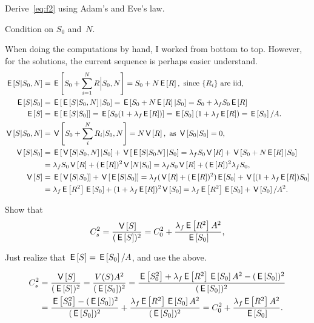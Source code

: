\documentclass[queueing-book.tex]{subfiles}
\begin{document}
\begin{exercise}\label{ex:f-4}
Derive~\cref{eq:f2} using  Adam's and Eve's law.
\begin{hint}
Condition on $S_0$ and~$N$.
\end{hint}
\begin{solution}
When doing the computations by hand, I worked from bottom to top. However, for the solutions, the current sequence is perhaps easier understand.
\begin{align*}
  \E{S|S_0, N} &=\E{S_0 + \sum_{i=1}^N R \Big|S_0, N} = S_0 + N \E R, \text{ since $\{R_i\}$ are iid},\\
  \E{S|S_0} &= \E{\E{S|S_{0}, N}|S_0} = \E{S_0 + N \E R |S_{0}} = S_0 + \lambda_f S_0 \E R\\
  \E{S} &= \E{\E{S|S_{0}}} = \E{S_0(1+\lambda_f  \E R)} = \E{S_0}(1 + \lambda_f \E R) = \E{S_0}/A.\\
  \V{S|S_0, N} &=  \V{S_0 + \sum_i^N R_i| S_{0}, N} = N \V R, \text{ as } \V{S_0|S_0} = 0,\\
\V{S|S_0} &= \E{\V{S|S_0, N} |S_0} + \V{\E{S|S_{0}N}|S_{0}} = \lambda_f S_0 \V R + \V{S_{0} + N \E R|S_0}\\
  &= \lambda_f S_0\V R + (\E R)^{2} \V{N|S_0} = \lambda_f S_0\V R + (\E R)^{2} \lambda_{f} S_{0}, \\
  \V S &= \E{\V{S|S_0}} + \V{\E{S|S_0}} = \lambda_f (\V R + (\E R)^2) \E{S_0} + \V{(1+\lambda_f \E R)S_{0}} \\
  &= \lambda_f \E{R^2} \E{S_0} + (1+\lambda_f \E R)^2 \V{S_{0}} = \lambda_f \E{R^2} \E{S_0} + \V{S_{0}}/A^{2}.
\end{align*}

\end{solution}
\end{exercise}


\begin{exercise}\label{ex:l-160}
Show that
 \begin{equation*}
 C_s^2 = \frac{\V{S}}{(\E S)^2} = C_0^2 + \frac{\lambda_f \E{R^2} A^2}{\E{S_0}},
 \end{equation*}
\begin{hint} Just realize that $\E{S} = \E{S_0}/A$, and use the above.
\end{hint}
\begin{solution}
 \begin{align*}
C_s^2 &= \frac{\V{S}}{(\E S)^2} =\frac{V(S) A^2}{(\E{S_0})^2}
=\frac{\E{S_0^2} + \lambda_f \E{R^2} \E{S_0}A^2 -(\E{S_0})^2}{(\E{S_0})^2} \\
&=\frac{\E{S_0^2} -(\E{S_0})^2}{(\E{S_0})^2} + \frac{\lambda_f \E{R^2} \E{S_0}A^2}{(\E{S_0})^2}
=C_0^2 + \frac{\lambda_f \E{R^2}A^2}{\E{S_0}}.
 \end{align*}
\end{solution}
\end{exercise}
\end{document}
